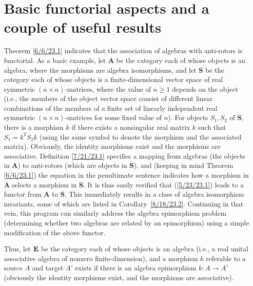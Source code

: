 \documentclass{amsart}
\theoremstyle{definition}
\numberwithin{theorem}{section}
\numberwithin{equation}{section}
\begin{document}
\section{Basic functorial aspects and a couple of useful results}
 Theorem \ref{6/6/23.1} indicates that the association of algebras with anti-rotors is functorial.  As a basic example, let {\bf A} be the category each of whose objects is an algebra, where the morphisms are algebra isomorphisms, and let {\bf S} be the category each of whose objects is a finite-dimensional vector space of real symmetric $(n\times n)$-matrices, where the value of $n\ge 1$ depends on the object (i.e., the members of the object vector space consist of different linear combinations of the members of a finite set of linearly independent real symmetric $(n\times n)$-matrices for some fixed value of $n$).  For objects $S_1,S_2$ of {\bf S}, there is a morphism $k$ if there exists a nonsingular real matrix $k$ such that \mbox{$S_1  = k^T  S_2 k$} (using the same symbol to denote the morphism and the associated matrix).  Obviously, the identity morphisms exist and the morphisms are associative.    Definition \ref{7/21/23.1} specifies a mapping from algebras (the objects in {\bf A}) to anti-rotors (which are objects in {\bf S}), and (keeping in mind Theorem \ref{6/6/23.1}) the equation in the penultimate sentence indicates how a morphism in {\bf A} selects a morphism in {\bf S}.  It is thus easily verified that (\ref{5/23/23.1}) leads to a functor from {\bf A} to {\bf S}.  This immediately results in a class of algebra isomorphism invariants, some of which are listed in  \mbox{Corollary \ref{8/18/23.2}}.
Continuing in that vein, this program can similarly address the algebra epimorphism problem (determining whether two algebras are related by an epimorphism) using a simple modification of the above functor.  

Thus, let ${\bf E}$ be the category each of whose objects is an algebra (i.e., a real unital associative algebra of nonzero finite-dimension), and a morphism $k$ referable to a source $A$ and target $A'$ exists if there is an algebra epimorphism  $k:A\rightarrow A'$ (obviously the identity morphisms exist, and the morphisms are associative).    
\end{document}
